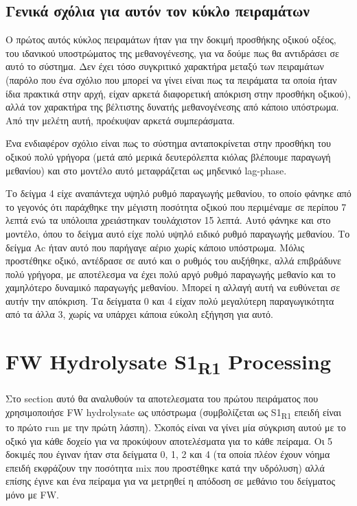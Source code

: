 \documentclass[11pt]{article}
\begin{document}
\subsection{Γενικά σχόλια για αυτόν τον κύκλο πειραμάτων}
\label{sec:org38c0b8f}
Ο πρώτος αυτός κύκλος πειραμάτων ήταν για την δοκιμή προσθήκης οξικού οξέος, του ιδανικού υποστρώματος της μεθανογένεσης, για να δούμε πως θα αντιδράσει σε αυτό το σύστημα. Δεν έχει τόσο συγκριτικό χαρακτήρα μεταξύ των πειραμάτων (παρόλο που ένα σχόλιο που μπορεί να γίνει είναι πως τα πειράματα τα οποία ήταν ίδια πρακτικά στην αρχή, είχαν αρκετά διαφορετική απόκριση στην προσθήκη οξικού), αλλά τον χαρακτήρα της βέλτιστης δυνατής μεθανογένεσης από κάποιο υπόστρωμα. Από την μελέτη αυτή, προέκυψαν αρκετά συμπεράσματα.

Ένα ενδιαφέρον σχόλιο είναι πως το σύστημα ανταποκρίνεται στην προσθήκη του οξικού πολύ γρήγορα (μετά από μερικά δευτερόλεπτα κιόλας βλέπουμε παραγωγή μεθανίου) και στο μοντέλο αυτό μεταφράζεται ως μηδενικό lag-phase.

Το δείγμα 4 είχε αναπάντεχα υψηλό ρυθμό παραγωγής μεθανίου, το οποίο φάνηκε από το γεγονός ότι παράχθηκε την μέγιστη ποσότητα οξικού που περιμέναμε σε περίπου 7 λεπτά ενώ τα υπόλοιπα χρειάστηκαν τουλάχιστον 15 λεπτά. Αυτό φάνηκε και στο μοντέλο, όπου το δείγμα αυτό είχε πολύ υψηλό ειδικό ρυθμό παραγωγής μεθανίου. Το δείγμα Ac ήταν αυτό που παρήγαγε αέριο χωρίς κάποιο υπόστρωμα. Μόλις προστέθηκε οξικό, αντέδρασε σε αυτό και ο ρυθμός του αυξήθηκε, αλλά επιβράδυνε πολύ γρήγορα, με αποτέλεσμα να έχει πολύ αργό ρυθμό παραγωγής μεθανίο και το χαμηλότερο δυναμικό παραγωγής μεθανίου. Μπορεί η αλλαγή αυτή να ευθύνεται σε αυτήν την απόκριση. Τα δείγματα 0 και 4 είχαν πολύ μεγαλύτερη παραγωγικότητα από τα άλλα 3, χωρίς να υπάρχει κάποια εύκολη εξήγηση για αυτό.

\pagebreak

\section{FW Hydrolysate S1\textsubscript{R1} Processing}
\label{sec:orgbb16cc1}
Στο section αυτό θα αναλυθούν τα αποτελεσματα του πρώτου πειράματος που χρησιμοποιήσε FW hydrolysate ως υπόστρωμα (συμβολίζεται ως S1\textsubscript{R1} επειδή είναι το πρώτο run με την πρώτη λάσπη). Σκοπός είναι να γίνει μία σύγκριση αυτού με το οξικό για κάθε δοχείο για να προκύψουν αποτελέσματα για το κάθε πείραμα. Οι 5 δοκιμές που έγιναν ήταν στα δείγματα 0, 1, 2 και 4 (τα οποία πλέον έχουν νόημα επειδή εκφράζουν την ποσότητα mix που προστέθηκε κατά την υδρόλυση) αλλά επίσης έγινε και ένα πείραμα για να μετρηθεί η απόδοση σε μεθάνιο του δείγματος μόνο με FW.
\end{document}
